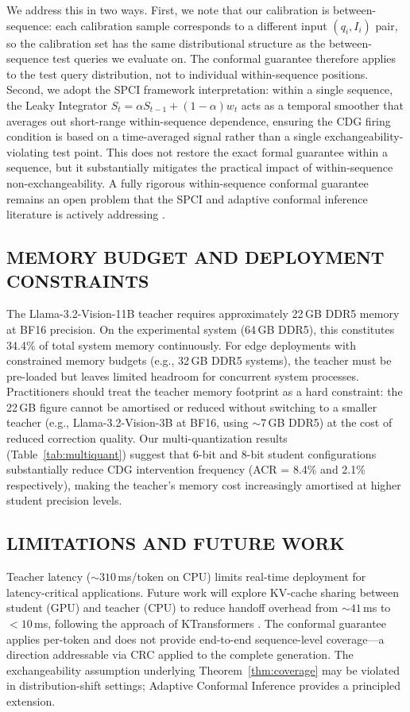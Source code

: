\documentclass{ieeetmlcn}
\begin{document}
We address this in two ways. First, we note that our calibration is between-sequence: each calibration sample corresponds to a different input $(q_i, I_i)$ pair, so the calibration set has the same distributional structure as the between-sequence test queries we evaluate on. The conformal guarantee therefore applies to the test query distribution, not to individual within-sequence positions. Second, we adopt the SPCI framework \cite{pmlr-v202-xu23r} interpretation: within a single sequence, the Leaky Integrator $S_t = \alpha S_{t-1} + (1-\alpha) w_t$ acts as a temporal smoother that averages out short-range within-sequence dependence, ensuring the CDG firing condition is based on a time-averaged signal rather than a single exchangeability-violating test point. This does not restore the exact formal guarantee within a sequence, but it substantially mitigates the practical impact of within-sequence non-exchangeability. A fully rigorous within-sequence conformal guarantee remains an open problem that the SPCI and adaptive conformal inference literature is actively addressing \cite{gibbs2021adaptive}.

\subsection{MEMORY BUDGET AND DEPLOYMENT CONSTRAINTS}
The Llama-3.2-Vision-11B teacher requires approximately 22\,GB DDR5 memory at BF16 precision. On the experimental system (64\,GB DDR5), this constitutes 34.4\% of total system memory continuously. For edge deployments with constrained memory budgets (e.g., 32\,GB DDR5 systems), the teacher must be pre-loaded but leaves limited headroom for concurrent system processes. Practitioners should treat the teacher memory footprint as a hard constraint: the 22\,GB figure cannot be amortised or reduced without switching to a smaller teacher (e.g., Llama-3.2-Vision-3B at BF16, using $\sim$7\,GB DDR5) at the cost of reduced correction quality. Our multi-quantization results (Table~\ref{tab:multiquant}) suggest that 6-bit and 8-bit student configurations substantially reduce CDG intervention frequency (ACR = 8.4\% and 2.1\% respectively), making the teacher's memory cost increasingly amortised at higher student precision levels.

\subsection{LIMITATIONS AND FUTURE WORK}
Teacher latency ($\sim\!310$\,ms/token on CPU) limits real-time
deployment for latency-critical applications. Future work will explore
KV-cache sharing between student (GPU) and teacher (CPU) to reduce
handoff overhead from $\sim\!41$\,ms to $<10$\,ms, following the
approach of KTransformers \cite{chen2025ktransformers}. The conformal
guarantee applies per-token and does not provide end-to-end
sequence-level coverage---a direction addressable via CRC \cite{angelopoulos2024conformal}
applied to the complete generation. The exchangeability assumption
underlying Theorem~\ref{thm:coverage} may be violated in
distribution-shift settings; Adaptive Conformal Inference
\cite{gibbs2021adaptive} provides a principled extension.
\end{document}
